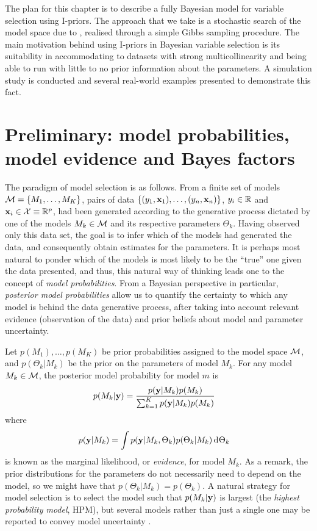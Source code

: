 \documentclass[11pt,twoside,openright]{report}
\begin{document}
The plan for this chapter is to describe a fully Bayesian model for variable selection using I-priors. 
The approach that we take is a stochastic search of the model space due to \citet{Kuo1998}, realised through a simple Gibbs sampling procedure.
The main motivation behind using I-priors in Bayesian variable selection is its suitability in accommodating to datasets with strong multicollinearity and being able to run with little to no prior information about the parameters.
A simulation study is conducted and several real-world examples presented to demonstrate this fact. 

\section{Preliminary: model probabilities, model evidence and Bayes factors}

The paradigm of model selection is as follows. 
From a finite set of models ${\mathcal M} = \{M_1,\dots,M_K\}$, pairs of data $\{(y_1,{\mathbf x}_1),\dots,(y_n,{\mathbf x}_n)\}$, $y_i\in\mathbb{R}$ and ${\mathbf x}_i\in{\mathcal X}\equiv\mathbb{R}^p$, had been generated according to the generative process dictated by one of the models $M_k \in {\mathcal M}$ and its respective parameters $\Theta_k$.
Having observed only this data set, the goal is to infer which of the models had generated the data, and consequently obtain estimates for the parameters.
It is perhaps most natural to ponder which of the models is most likely to be the ``true'' one given the data presented, and thus, this natural way of thinking leads one to the concept of \emph{model probabilities}.
From a Bayesian perspective in particular, \emph{posterior model probabilities} allow us to quantify the certainty to which any model is behind the data generative process, after taking into account relevant evidence (observation of the data) and prior beliefs about model and parameter uncertainty.

Let $p(M_1),\dots,p(M_K)$ be prior probabilities assigned to the model space ${\mathcal M}$, and $p(\Theta_k|M_k)$ be the prior on the parameters of model $M_k$.
For any model $M_k \in {\mathcal M}$, the posterior model probability for model $m$ is
\begin{align}\label{eq:pmp}
  p(M_k|{\mathbf y}) 
  &=\frac{p({\mathbf y}|M_k)p(M_k)}{\sum_{k=1}^K p({\mathbf y}|M_k)p(M_k) } 
\end{align}
where 
\begin{align}\label{eq:modelevidence2}
  p({\mathbf y}|M_k)
  &= \int p({\mathbf y}|M_k,\Theta_k)p(\Theta_k|M_k) \operatorname{d}\hspace{0.5pt}\!\Theta_k
\end{align}
is known as the marginal likelihood, or \emph{evidence}, for model $M_k$.
As a remark, the prior distributions for the parameters do not necessarily need to depend on the model, so we might have that $p(\Theta_k|M_k)=p(\Theta_k)$.
A natural strategy for model selection is to select the model such that $p(M_k|{\mathbf y})$ is largest (the \emph{highest probability model}, HPM), but several models rather than just a single one may be reported to convey model uncertainty \citep{Chipman2001}.
\end{document}
